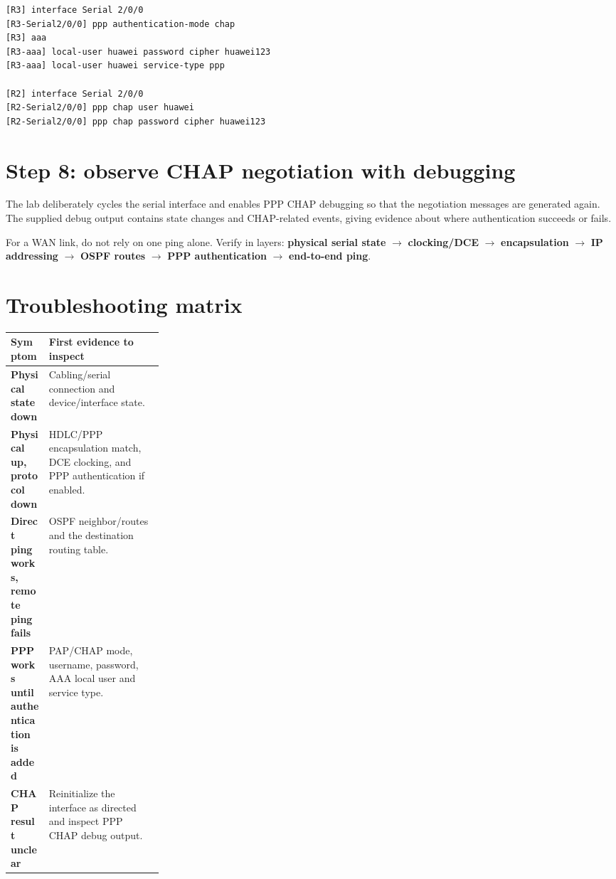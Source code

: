 \begin{lstlisting}[style=dcnterminal]
[R3] interface Serial 2/0/0
[R3-Serial2/0/0] ppp authentication-mode chap
[R3] aaa
[R3-aaa] local-user huawei password cipher huawei123
[R3-aaa] local-user huawei service-type ppp

[R2] interface Serial 2/0/0
[R2-Serial2/0/0] ppp chap user huawei
[R2-Serial2/0/0] ppp chap password cipher huawei123
\end{lstlisting}

\section{Step 8: observe CHAP negotiation with debugging}
The lab deliberately cycles the serial interface and enables PPP CHAP debugging so that the negotiation messages are generated again. The supplied debug output contains state changes and CHAP-related events, giving evidence about where authentication succeeds or fails.


\begin{verifybox}
For a WAN link, do not rely on one ping alone. Verify in layers: \textbf{physical serial state} $\rightarrow$ \textbf{clocking/DCE} $\rightarrow$ \textbf{encapsulation} $\rightarrow$ \textbf{IP addressing} $\rightarrow$ \textbf{OSPF routes} $\rightarrow$ \textbf{PPP authentication} $\rightarrow$ \textbf{end-to-end ping}.
\end{verifybox}

\section{Troubleshooting matrix}
\begin{tabularx}{\linewidth}{>{\bfseries}p{0.25\linewidth}X}
\toprule
Symptom & First evidence to inspect\\\midrule
Physical state down & Cabling/serial connection and device/interface state.\\
Physical up, protocol down & HDLC/PPP encapsulation match, DCE clocking, and PPP authentication if enabled.\\
Direct ping works, remote ping fails & OSPF neighbor/routes and the destination routing table.\\
PPP works until authentication is added & PAP/CHAP mode, username, password, AAA local user and service type.\\
CHAP result unclear & Reinitialize the interface as directed and inspect PPP CHAP debug output.\\\bottomrule
\end{tabularx}

